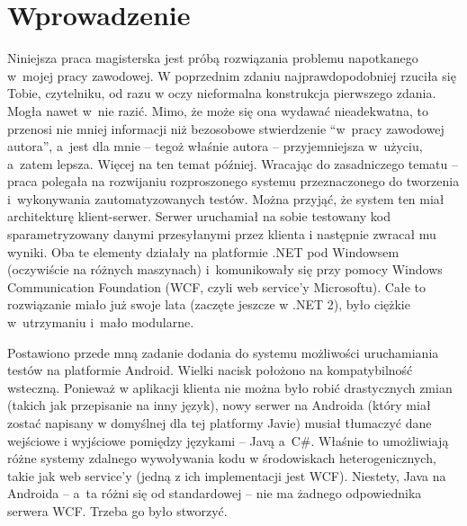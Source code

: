 \chapter{Wprowadzenie}

Niniejsza praca magisterska jest próbą rozwiązania problemu napotkanego w~mojej pracy zawodowej. W poprzednim zdaniu najprawdopodobniej rzuciła się Tobie, czytelniku, od razu w oczy nieformalna konstrukcja pierwszego zdania. Mogła nawet w~nie razić. Mimo, że może się ona wydawać nieadekwatna, to przenosi nie mniej informacji niż bezosobowe stwierdzenie ``w~pracy zawodowej autora'', a~jest dla mnie -- tegoż właśnie autora -- przyjemniejsza w~użyciu, a~zatem lepsza. Więcej na ten temat później. Wracając do zasadniczego tematu -- praca polegała na rozwijaniu rozproszonego systemu przeznaczonego do tworzenia i~wykonywania zautomatyzowanych testów. Można przyjąć, że system ten miał architekturę klient-serwer. Serwer uruchamiał na sobie testowany kod sparametryzowany danymi przesyłanymi przez klienta i następnie zwracał mu wyniki. Oba te elementy działały na platformie .NET pod Windowsem (oczywiście na różnych maszynach) i~komunikowały się przy pomocy Windows Communication Foundation (WCF, czyli web service'y Microsoftu). Całe to rozwiązanie miało już swoje lata (zaczęte jeszcze w .NET 2), było ciężkie w~utrzymaniu i~mało modularne.

Postawiono przede mną zadanie dodania do systemu możliwości uruchamiania testów na platformie Android. Wielki nacisk położono na kompatybilność wsteczną. Ponieważ w aplikacji klienta nie można było robić drastycznych zmian (takich jak przepisanie na inny język), nowy serwer na Androida (który miał zostać napisany w domyślnej dla tej platformy Javie) musiał tłumaczyć dane wejściowe i wyjściowe pomiędzy językami -- Javą a~C\#.  Właśnie to umożliwiają różne systemy zdalnego wywoływania kodu w środowiskach heterogenicznych, takie jak web service'y (jedną z ich implementacji jest WCF). Niestety, Java na Androida -- a~ta różni się od standardowej -- nie ma żadnego odpowiednika serwera WCF. Trzeba go było stworzyć.

